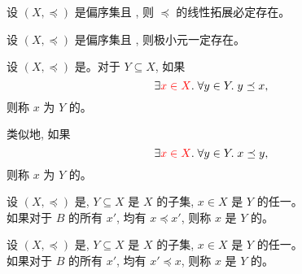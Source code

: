\begin{frame}{}
  \begin{theorem}
    设 $(X, \preceq)$ 是偏序集且 , 则 $\preceq$ 的线性拓展必定存在。
  \end{theorem}


  \pause
  \vspace{0.30cm}
  \begin{theorem}
    设 $(X, \preceq)$ 是偏序集且 , 则极小元一定存在。
  \end{theorem}
\end{frame}

\begin{frame}{}
  \begin{definition}
    设 $(X, \preceq)$ 是。对于 $Y \subseteq X$, 如果
    \[
      \exists \textcolor{red}{x \in X}.\; \forall y \in Y.\; y \preceq x,
    \]
    则称 $x$ 为 $Y$ 的。

    \vspace{0.30cm}
    类似地, 如果
    \[
      \exists \textcolor{red}{x \in X}.\; \forall y \in Y.\; x \preceq y,
    \]
    则称 $x$ 为 $Y$ 的。
  \end{definition}

\end{frame}

\begin{frame}{}
  \begin{definition}
    设 $(X, \preceq)$ 是, $Y \subseteq X$ 是 $X$ 的子集,
    $x \in X$ 是 $Y$ 的任一。 \\[5pt]
    如果对于 $B$ 的所有 $x'$, 均有 $x \preceq x'$,
    则称 $x$ 是 $Y$ 的。
  \end{definition}


  \begin{definition}
    设 $(X, \preceq)$ 是, $Y \subseteq X$ 是 $X$ 的子集,
    $x \in X$ 是 $Y$ 的任一。 \\[5pt]
    如果对于 $B$ 的所有 $x'$, 均有 $x' \preceq x$,
    则称 $x$ 是 $Y$ 的。
  \end{definition}
\end{frame}

